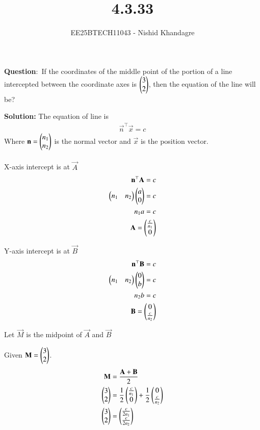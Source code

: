 \documentclass[journal]{IEEEtran}
\title{4.3.33}
\author{EE25BTECH11043 - Nishid Khandagre}
\begin{document}
\maketitle

\renewcommand{\thefigure}{\theenumi}
\renewcommand{\thetable}{\theenumi}


\textbf{Question}:\
If the coordinates of the middle point of the portion of a line intercepted between the
coordinate axes is $\begin{pmatrix}3\\2\end{pmatrix}$, then the equation of the line will be?

\textbf{Solution: }
The equation of line is
\begin{align}
\vec{n}^\top\vec{x} = c
\end{align}
Where $\mathbf{n} = \begin{pmatrix}n_1 \\ n_2\end{pmatrix}$ is the normal vector and $\vec{x}$ is the position vector.\\ \\




X-axis intercept is at $\vec{A}$
\begin{align}
\mathbf{n}^\top\mathbf{A}=c\\
\begin{pmatrix}n_1&n_2\end{pmatrix}\begin{pmatrix}a\\0\end{pmatrix}=c\\
n_1a=c\\
\mathbf{A}=\begin{pmatrix}\frac{c}{n_1}\\0\end{pmatrix}
\end{align}

Y-axis intercept is at $\vec{B}$
\begin{align}
\mathbf{n}^\top\mathbf{B}=c\\
\begin{pmatrix}n_1&n_2\end{pmatrix}\begin{pmatrix}0\\b\end{pmatrix}=c\\
n_2b=c\\
\mathbf{B}=\begin{pmatrix}0\\\frac{c}{n_2}\end{pmatrix}
\end{align}


Let $\vec{M}$ is the midpoint of $\vec{A}$ and $\vec{B}$

Given $\mathbf{M} = \begin{pmatrix}3 \\ 2\end{pmatrix}$.
\begin{align}
\mathbf{M} &= \frac{\mathbf{A} + \mathbf{B}}{2} \\
\begin{pmatrix}3\\2\end{pmatrix}&= \frac{1}{2} \begin{pmatrix}\frac{c}{n_1} \\ 0\end{pmatrix} + \frac{1}{2} \begin{pmatrix}0 \\ \frac{c}{n_2}\end{pmatrix} \\
\begin{pmatrix}3\\2\end{pmatrix}&= \begin{pmatrix}\frac{c}{2n_1} \\ \frac{c}{2n_2}\end{pmatrix}
\end{align}
\end{document}
